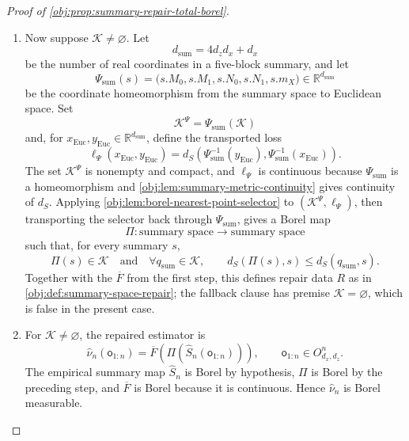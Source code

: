 \documentclass[11pt]{article}
\begin{document}
\begin{proof}[Proof of \cref{obj:prop:summary-repair-total-borel}]
\begin{enumerate}
\item Now suppose \(\mathcal K\ne\varnothing\).  Let
\[
d_{\mathrm{sum}}=4d_zd_x+d_x
\]
be the number of real coordinates in a five-block summary, and let
\[
\Psi_{\mathrm{sum}}(s)
=\bigl(s.M_0,s.M_1,s.N_0,s.N_1,s.m_X\bigr)\in\mathbb R^{d_{\mathrm{sum}}}
\]
be the coordinate homeomorphism from the summary space to Euclidean space.  Set
\[
\mathcal K^\Psi=\Psi_{\mathrm{sum}}(\mathcal K)
\]
and, for \(x_{\mathrm{Euc}},y_{\mathrm{Euc}}\in\mathbb R^{d_{\mathrm{sum}}}\), define the transported loss
\[
\ell_\Psi(x_{\mathrm{Euc}},y_{\mathrm{Euc}})
=
d_S\!\left(\Psi_{\mathrm{sum}}^{-1}(y_{\mathrm{Euc}}),
           \Psi_{\mathrm{sum}}^{-1}(x_{\mathrm{Euc}})\right).
\]
The set \(\mathcal K^\Psi\) is nonempty and compact, and \(\ell_\Psi\) is continuous because \(\Psi_{\mathrm{sum}}\) is a homeomorphism and \cref{obj:lem:summary-metric-continuity} gives continuity of \(d_S\).  Applying \cref{obj:lem:borel-nearest-point-selector} to \((\mathcal K^\Psi,\ell_\Psi)\), then transporting the selector back through \(\Psi_{\mathrm{sum}}\), gives a Borel map
\[
\Pi:\text{summary space}\longrightarrow \text{summary space}
\]
such that, for every summary \(s\),
\[
\Pi(s)\in\mathcal K
\quad\text{and}\quad
\forall q_{\mathrm{sum}}\in\mathcal K,\qquad
d_S(\Pi(s),s)\le d_S(q_{\mathrm{sum}},s).
\]
Together with the \(\overline F\) from the first step, this defines repair data \(R\) as in \cref{obj:def:summary-space-repair}; the fallback clause has premise \(\mathcal K=\varnothing\), which is false in the present case. \hfill{}%

\item For \(\mathcal K\ne\varnothing\), the repaired estimator is
\[
\widehat\nu_n(\mathsf o_{1:n})
=
\overline F\!\left(\Pi(\widehat S_n(\mathsf o_{1:n}))\right),
\qquad
\mathsf o_{1:n}\in O_{d_x,d_z}^n.
\]
The empirical summary map \(\widehat S_n\) is Borel by hypothesis, \(\Pi\) is Borel by the preceding step, and \(\overline F\) is Borel because it is continuous.  Hence \(\widehat\nu_n\) is Borel measurable. \hfill{}%


\end{enumerate}
\end{proof}
\end{document}
